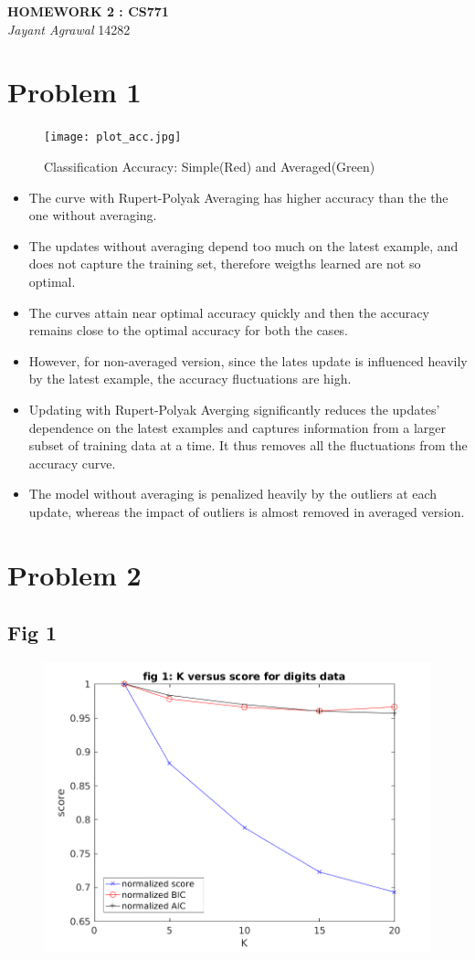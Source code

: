 \documentclass{article}
\begin{document}

\begin{center}
\textbf{\Large HOMEWORK 2 : CS771} \\
\textit{\large Jayant Agrawal}         14282
\end{center}
\section{Problem 1}
\begin{figure}[h!]
\centering
\texttt{[image: plot\_acc.jpg]}
\caption{Classification Accuracy: Simple(Red) and Averaged(Green)}
\label{acc}
\end{figure}

\begin{itemize}
\item The curve with Rupert-Polyak Averaging has higher accuracy than the the one without averaging.
\item The updates without averaging depend too much on the latest example, and does not capture the training set, therefore weigths learned are not so optimal.
\item The curves attain near optimal accuracy quickly and then the accuracy remains close to the optimal accuracy for both the cases.
\item However, for non-averaged version, since the lates update is influenced heavily by the latest example, the accuracy fluctuations are high.
\item Updating with Rupert-Polyak Averging significantly reduces the updates' dependence on the latest examples and captures information from a larger subset of training data at a time. It thus removes all the fluctuations from the accuracy curve.
\item The model without averaging is penalized heavily by the outliers at each update, whereas the impact of outliers is almost removed in averaged version.
\end{itemize}

\section{Problem 2}
\subsection{Fig 1}
\begin{figure}[h!]
\begin{center}
\includegraphics[width=0.5\columnwidth]{RunResults2/1.png}
\label{1}
\end{center}
\end{figure}
\end{document}
